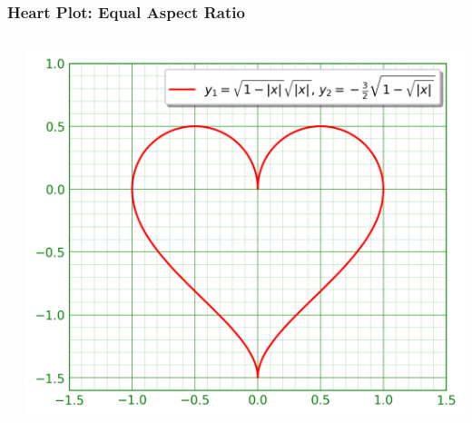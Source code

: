 \documentclass[xcolor={svgnames}]{beamer}
\newcommand{\pyfile}[2][]{}
\begin{document}
\begin{frame}[t,fragile]
    \frametitle{Heart Plot: Equal Aspect Ratio}
    \vspace{-2mm}
    \begin{columns}[T]
        \begin{column}{0.47\textwidth}
            \pyfile[style=tiny,linerange=30]{examples/heart-7.py}
        \end{column}
        \begin{column}{0.53\textwidth}
            \includegraphics[width=\textwidth]{img/heart-7.png}
        \end{column}
    \end{columns}
\end{frame}
\end{document}

